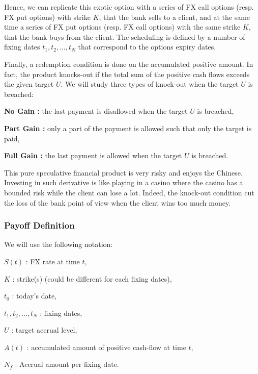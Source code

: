 Hence, we can replicate this exotic option with a series of FX call options (resp. FX put options) with strike $K$, that the bank sells to a client, and at the same time a series of FX put options (resp. FX call options) with the same strike $K$, that the bank buys from the client. The scheduling is defined by a number of fixing dates $t_1,t_2,\ldots,t_N$ that correspond to the options expiry dates.

Finally, a redemption condition is done on the accumulated positive amount. In fact, the product knocks-out if the total sum of the positive cash flows exceeds the given target $U$. We will study three types of knock-out when the target $U$ is breached:
\begin{my_list_item}
\item \textbf{No Gain :} the last payment is disallowed when the target $U$ is breached,
\item \textbf{Part Gain :} only a part of the payment is allowed such that only the target is paid,
\item \textbf{Full Gain :} the last payment is allowed when the target $U$ is breached. 
\end{my_list_item}

This pure speculative financial product is very risky and enjoys the Chinese. Investing in such derivative is like playing in a casino where the casino has a bounded risk while the client can lose a lot. Indeed, the knock-out condition cut the loss of the bank point of view when the client wins too much money.

\subsubsection*{Payoff Definition}
\label{sec:intro:Payoff}
We will use the following notation:
\begin{my_list_item}
\item $S(t)$ : FX rate at time $t$,
\item $K$ : strike(s) (could be different for each fixing dates),
\item $t_0$ : today's date,
\item $t_1,t_2,\ldots,t_N$ : fixing dates,
\item $U$ : target accrual level,
\item $A(t)$ : accumulated amount of positive cash-flow at time $t$,
\item $N_f$ : Accrual amount per fixing date.
\end{my_list_item}

